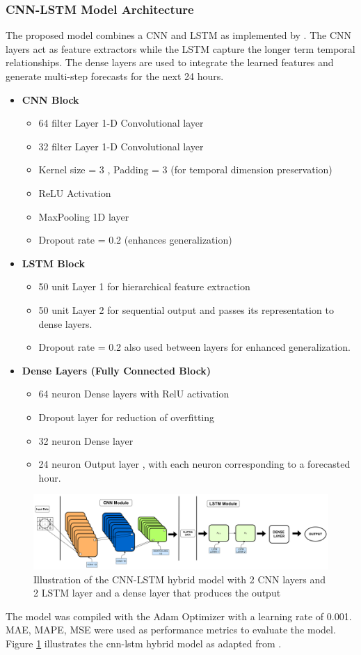 \subsubsection{CNN-LSTM Model Architecture}
The proposed model combines a CNN and LSTM as implemented by \cite{rafi2021short}. The CNN layers act as feature extractors while the LSTM capture the longer term temporal relationships. The dense layers are used to integrate the learned features and generate multi-step forecasts for the next 24 hours.
{\small
\begin{itemize}
	\item \textbf{CNN Block}   \begin{itemize}
		\item 64 filter Layer 1-D Convolutional layer
		\item 32 filter Layer 1-D Convolutional layer
		\item Kernel size = 3 , Padding = 3 (for temporal dimension preservation)
		\item ReLU Activation 
		\item MaxPooling 1D layer
		\item Dropout rate =  0.2 (enhances generalization)
	\end{itemize}
	\item \textbf{LSTM Block} \begin{itemize}
		\item 50 unit Layer 1 for hierarchical feature extraction
		\item 50 unit Layer 2 for sequential output and passes its representation to dense layers.
		\item Dropout rate = 0.2 also used between layers for enhanced generalization.
	\end{itemize}
	\item \textbf{Dense Layers (Fully Connected Block)}  \begin{itemize}
		\item 64 neuron Dense layers with RelU activation
		\item Dropout layer for reduction of overfitting
		\item 32 neuron Dense layer
		\item 24 neuron Output layer , with each neuron corresponding to a forecasted hour.
	\end{itemize}
\end{itemize}}
\begin{figure}[h]
	\centering
	\includegraphics[width=\linewidth]{Chapters/images/CNN-LSTM}
	\caption{Illustration of the CNN-LSTM hybrid model with 2 CNN layers and 2 LSTM layer and a dense layer that produces the output}
	\label{fig:cnn-lstm}
\end{figure}
The model was compiled with the Adam Optimizer with a learning rate of 0.001. MAE, MAPE, MSE were used as performance metrics to evaluate the model. Figure \ref{fig:cnn-lstm} illustrates the cnn-lstm hybrid model as adapted from \cite{rafi2021short}.
